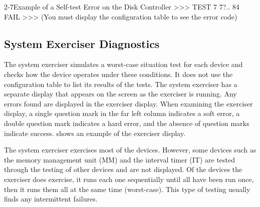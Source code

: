 \newpage 
\begin{ttfig}{2-7}{Example of a Self-test Error on the Disk Controller}
  >>> TEST 7
    7?..
    84 FAIL
  >>>
(You must display the configuration table to see the error code)
\end{ttfig}

\newpage

\subsection{System Exerciser Diagnostics}

The system exerciser simulates a worst-case situation test for each device
and checks how the device operates under these conditions. It does not use
the configuration table to list its results of the tests. The system exerciser
has a separate display that appears on the screen as the exerciser is running.
Any errors found are displayed in the exerciser display. When examining
the exerciser display, a single question mark in the far left column indicates
a soft error, a double question mark indicates a hard error, and the absence
of question marks indicate success.  shows an example of the
exerciser display.

The system exerciser exercises most of the devices. However, some devices
such as the memory management unit (MM) and the interval timer (IT) are
tested through the testing of other devices and are not displayed. Of the
devices the exerciser does exercise, it runs each one sequentially until all
have been run once, then it runs them all at the same time (worst-case).
This type of testing usually finds any intermittent failures.

